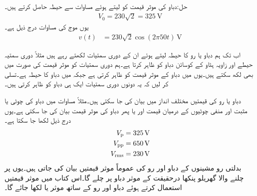 حل:دباو کی موثر قیمت کو  لیتے ہوئے  مساوات  سے  حیطہ حاصل کرتے ہیں۔
\begin{align}
V_0=230 \sqrt{2}=\SI{325}{\volt}
\end{align}
یوں موج کی مساوات درج ذیل ہے۔
\begin{align}\label{مساوات_طاقت_پاکستانی_گھریلو_دباو}
v(t)&=230 \sqrt{2}\cos (2\pi 50 t)\, \si{\volt}
\end{align}

اب تک ہم دباو یا رو کا حیطہ لیتے ہوئے ان کے دوری سمتیات لکھتے رہے ہیں مثلاً   دوری سمتیہ  حیطے اور  زاویہ ہٹاو کے کوسائن دباو کو ظاہر کرتا ہے۔ہم دوری سمتیات کو موثر قیمت کی صورت میں بھی لکھ سکتے ہیں۔یوں
  میں  دباو کے موثر قیمت کو ظاہر کرتی ہے  جبکہ
  میں  دباو کا حیطہ ہے۔تسلی کر لیں کہ یہ دونوں دوری سمتیات ایک ہی دباو کو ظاہر کرتی ہیں۔

دباو یا رو کی قیمتیں مختلف انداز میں بیان کی جا سکتی  ہیں۔مثلاً مساوات  میں دباو کی چوٹی  یا مثبت اور منفی چوٹیوں کے درمیان قیمت  اور یا پھر دباو کی موثر قیمت  بیان کی جا سکتی ہے۔یوں درج ذیل لکھا جا سکتا ہے۔
\begin{align*}
V_{\textup{p}}&=\SI{325}{\volt}\\
V_{\textup{pp}}&=\SI{650}{\volt}\\
{V_{\textup{rms}}}&=\SI{230}{\volt}
\end{align*}
بدلتی رو مشینوں کے دباو اور رو کی عموماً موثر قیمتیں بیان کی جاتی ہیں۔یوں  پر چلنے والا گھریلو پنکھا درحقیقت  کے موثر دباو پر چلے گا۔اس کتاب میں موثر قیمتیں استعمال کرتے ہوئے دباو اور رو کے ساتھ موثر یا  لکھا جائے گا۔

